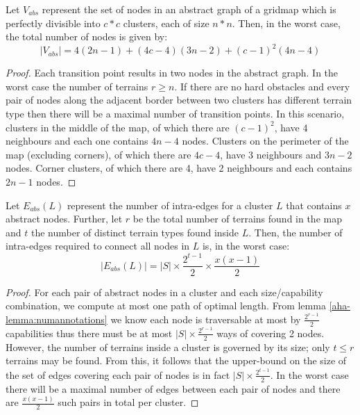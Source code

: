 \begin{lemma}
\label{aha-lemma:maxnodes}
Let $V_{abs}$ represent the set of nodes in an abstract graph of a gridmap which is perfectly divisible into $c*c$ clusters, each of size $n*n$. Then, in the worst case, the total number of nodes is given by:
$$|V_{abs}| = 4(2n-1) + (4c - 4)(3n-2) + (c-1)^2(4n-4)$$
\end{lemma}

\begin{proof}
Each transition point results in two nodes in the abstract graph. 
In the worst case the number of terrains $r \geq n$. 
If there are no hard obstacles and every pair of nodes along the adjacent border between two clusters has different terrain type then there will be a maximal number of transition points. 
In this scenario, clusters in the middle of the map, of which there are $(c-1)^2$, have 4 neighbours and each one contains $4n-4$ nodes. 
Clusters on the perimeter of the map (excluding corners), of which there are $4c-4$, have 3 neighbours and $3n-2$ nodes. 
Corner clusters, of which there are 4, have 2 neighbours and each contains $2n-1$ nodes.
\end{proof}

\begin{lemma}
\label{aha-lemma:maxedgesincluster}
Let $E_{abs}(L)$ represent the number of intra-edges for a cluster $L$ that contains $x$ abstract nodes. Further, let $r$ be the total number of terrains found in the map and $t$ the number of distinct terrain types found inside $L$. Then, the number of intra-edges required to connect all nodes in $L$ is, in the worst case:
 $$|E_{abs}(L)| = |S|\times \frac{2^{t-1}}{2} \times \frac{x(x-1)}{2}$$
 \end{lemma}

\begin{proof}
For each pair of abstract nodes in a cluster and each size/capability combination, we compute at most one path of optimal length. 
From lemma \ref{aha-lemma:numannotations} we know each node is traversable at most by $\frac{2^{r-1}}{2}$ capabilities thus there must be at most $|S|\times \frac{2^{r-1}}{2}$ ways of covering 2 nodes. 
However, the number of terrains inside a cluster is governed by its size; only $t \leq r$ terrains may be found. 
From this, it follows that the upper-bound on the size of the set of edges covering each pair of nodes is in fact $|S| \times \frac{2^{t-1}}{2}$. 
In the worst case there will be a maximal number of edges between each pair of nodes and there are $\frac{x(x-1)}{2}$ such pairs in total per cluster. 
\end{proof}

